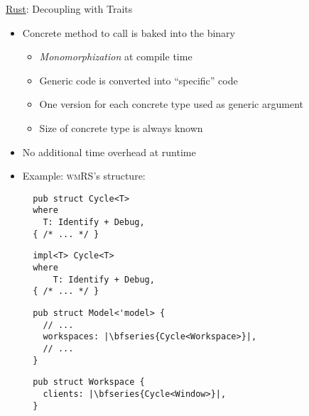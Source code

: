 \begin{frame}[fragile]{\underline{Rust}: Decoupling with Traits \hfill {\footnotesize \currentname}}


    \begin{itemize}

        \item Concrete method to call is baked into the binary
            \begin{itemize}
                \item \textit{Monomorphization} at compile time
                \item Generic code is converted into ``specific'' code
                \item One version for each concrete type used as generic argument
                \item Size of concrete type is always known
            \end{itemize}

        \item No additional time overhead at runtime

        \item Example: \textsc{wmRS}'s  structure:\\[3pt]
\begin{minipage}{.45\linewidth}
\begin{verbatim}
  pub struct Cycle<T>
  where
    T: Identify + Debug,
  { /* ... */ }
\end{verbatim}
\begin{verbatim}
  impl<T> Cycle<T>
  where
      T: Identify + Debug,
  { /* ... */ }
\end{verbatim}
\end{minipage}%
\begin{minipage}{.40\linewidth}
\begin{verbatim}
  pub struct Model<'model> {
    // ...
    workspaces: |\bfseries{Cycle<Workspace>}|,
    // ...
  }
\end{verbatim}
\begin{verbatim}
  pub struct Workspace {
    clients: |\bfseries{Cycle<Window>}|,
  }
\end{verbatim}
\end{minipage}

    \end{itemize}

    \vfill

\end{frame}

